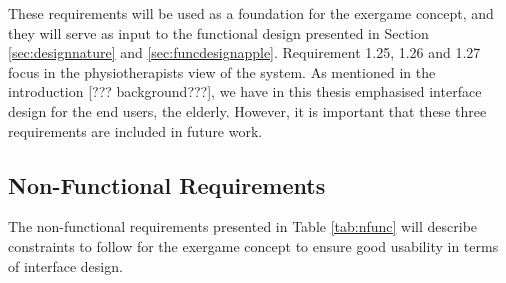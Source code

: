 These requirements will be used as a foundation for the exergame concept, and they will serve as input to the functional design presented in Section \ref{sec:designnature} and \ref{sec:funcdesignapple}. Requirement 1.25, 1.26 and 1.27 focus in the physiotherapists view of the system. As mentioned in the introduction [??? background???], we have in this thesis emphasised interface design for the end users, the elderly. However, it is important that these three requirements are included in future work.

\subsection{Non-Functional Requirements}
The non-functional requirements presented in Table \ref{tab:nfunc} will describe constraints to follow for the exergame concept to ensure good usability in terms of interface design.

